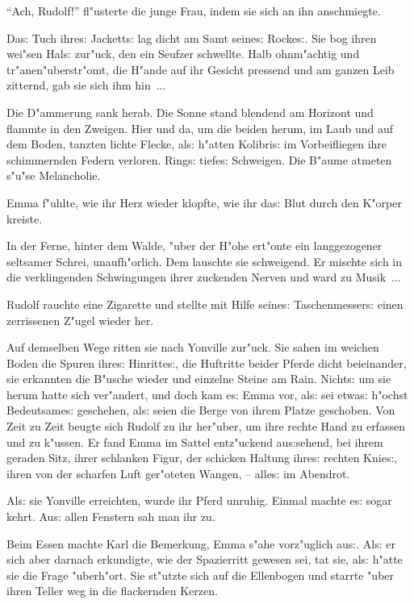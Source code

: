 \documentclass[oneside,12pt]{book}
\newcommand{\s}{s:}%
\begin{document}
"`Ach, Rudolf!"' fl"usterte die junge Frau, indem sie sich an ihn
anschmiegte.

Da{\s} Tuch ihre{\s} Jackett{\s} lag dicht am Samt seine{\s}
Rocke{\s}. Sie bog ihren wei"sen Hal{\s} zur"uck, den ein Seufzer
schwellte. Halb ohnm"achtig und tr"anen"uberstr"omt, die H"ande
auf ihr Gesicht pressend und am ganzen Leib zitternd, gab sie sich
ihm hin~...

Die D"ammerung sank herab. Die Sonne stand blendend am Horizont
und flammte in den Zweigen. Hier und da, um die beiden herum, im
Laub und auf dem Boden, tanzten lichte Flecke, al{\s} h"atten
Kolibri{\s} im Vorbeifliegen ihre schimmernden Federn verloren.
Ring{\s} tiefe{\s} Schweigen. Die B"aume atmeten s"u"se
Melancholie.

Emma f"uhlte, wie ihr Herz wieder klopfte, wie ihr da{\s} Blut
durch den K"orper kreiste.

In der Ferne, hinter dem Walde, "uber der H"ohe ert"onte ein
langgezogener seltsamer Schrei, unaufh"orlich. Dem lauschte sie
schweigend. Er mischte sich in die verklingenden Schwingungen
ihrer zuckenden Nerven und ward zu Musik~...

Rudolf rauchte eine Zigarette und stellte mit Hilfe seine{\s}
Taschenmesser{\s} einen zerrissenen Z"ugel wieder her.

Auf demselben Wege ritten sie nach Yonville zur"uck. Sie sahen im
weichen Boden die Spuren ihre{\s} Hinritte{\s}, die Huftritte
beider Pferde dicht beieinander, sie erkannten die B"usche wieder
und einzelne Steine am Rain. Nicht{\s} um sie herum hatte sich
ver"andert, und doch kam e{\s} Emma vor, al{\s} sei etwa{\s}
h"ochst Bedeutsame{\s} geschehen, al{\s} seien die Berge von ihrem
Platze geschoben. Von Zeit zu Zeit beugte sich Rudolf zu ihr
her"uber, um ihre rechte Hand zu erfassen und zu k"ussen. Er fand
Emma im Sattel ent\/z"uckend au{\s}sehend, bei ihrem geraden Sitz,
ihrer schlanken Figur, der schicken Haltung ihre{\s} rechten
Knie{\s}, ihren von der scharfen Luft ger"oteten Wangen, --
alle{\s} im Abendrot.

Al{\s} sie Yonville erreichten, wurde ihr Pferd unruhig. Einmal
machte e{\s} sogar kehrt. Au{\s} allen Fenstern sah man ihr zu.

Beim Essen machte Karl die Bemerkung, Emma s"ahe vorz"uglich
au{\s}. Al{\s} er sich aber darnach erkundigte, wie der
Spazierritt gewesen sei, tat sie, al{\s} h"atte sie die Frage
"uberh"ort. Sie st"utzte sich auf die Ellenbogen und starrte "uber
ihren Teller weg in die flackernden Kerzen.
\end{document}
